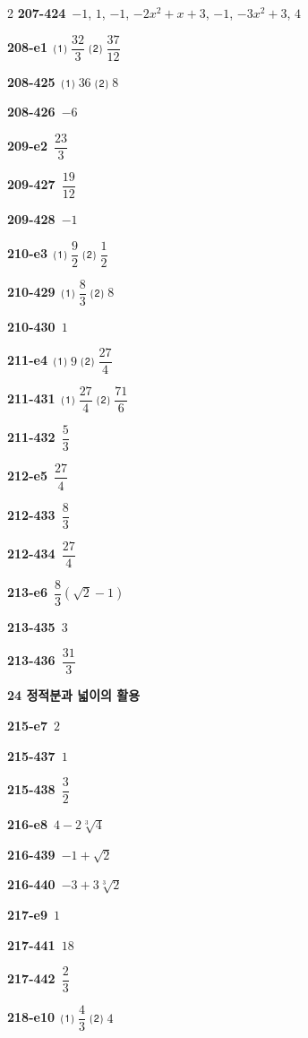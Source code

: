 \documentclass[10pt,a4paper]{article}
\begin{document}
\begin{multicols}{2}
\noindent\textbf{207-424}\ $-1$, $1$, $-1$, $-2x^2+x+3$, $-1$, $-3x^2+3$, $4$\par
\noindent\textbf{208-e1}\ ⑴ $\dfrac{32}{3}$ ⑵ $\dfrac{37}{12}$\par
\noindent\textbf{208-425}\ ⑴ $36$ ⑵ $8$\par
\noindent\textbf{208-426}\ $-6$\par
\noindent\textbf{209-e2}\ $\dfrac{23}{3}$\par
\noindent\textbf{209-427}\ $\dfrac{19}{12}$\par
\noindent\textbf{209-428}\ $-1$\par
\noindent\textbf{210-e3}\ ⑴ $\dfrac{9}{2}$ ⑵ $\dfrac{1}{2}$\par
\noindent\textbf{210-429}\ ⑴ $\dfrac{8}{3}$ ⑵ $8$\par
\noindent\textbf{210-430}\ $1$\par
\noindent\textbf{211-e4}\ ⑴ $9$ ⑵ $\dfrac{27}{4}$\par
\noindent\textbf{211-431}\ ⑴ $\dfrac{27}{4}$ ⑵ $\dfrac{71}{6}$\par
\noindent\textbf{211-432}\ $\dfrac{5}{3}$\par
\noindent\textbf{212-e5}\ $\dfrac{27}{4}$\par
\noindent\textbf{212-433}\ $\dfrac{8}{3}$\par
\noindent\textbf{212-434}\ $\dfrac{27}{4}$\par
\noindent\textbf{213-e6}\ $\dfrac{8}{3}(\sqrt{2}-1)$\par
\noindent\textbf{213-435}\ $3$\par
\noindent\textbf{213-436}\ $\dfrac{31}{3}$\par
\noindent\textbf{24 정적분과 넓이의 활용}\par\smallskip
\noindent\textbf{215-e7}\ $2$\par
\noindent\textbf{215-437}\ $1$\par
\noindent\textbf{215-438}\ $\dfrac{3}{2}$\par
\noindent\textbf{216-e8}\ $4-2\sqrt[3]{4}$\par
\noindent\textbf{216-439}\ $-1+\sqrt{2}$\par
\noindent\textbf{216-440}\ $-3+3\sqrt[3]{2}$\par
\noindent\textbf{217-e9}\ $1$\par
\noindent\textbf{217-441}\ $18$\par
\noindent\textbf{217-442}\ $\dfrac{2}{3}$\par
\noindent\textbf{218-e10}\ ⑴ $\dfrac{4}{3}$ ⑵ $4$\par

\end{multicols}
\end{document}
